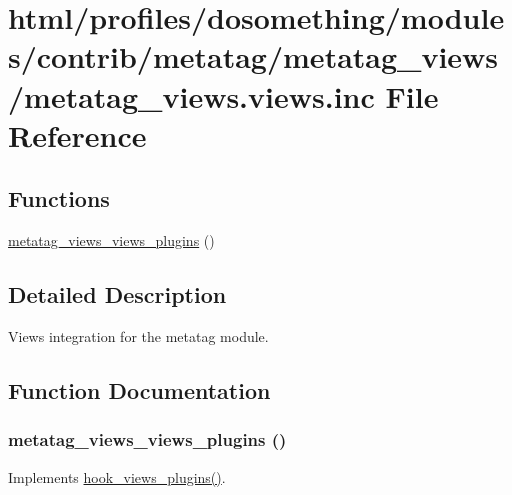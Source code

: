 \hypertarget{metatag__views_8views_8inc}{
\section{html/profiles/dosomething/modules/contrib/metatag/metatag\_\-views/metatag\_\-views.views.inc File Reference}
\label{metatag__views_8views_8inc}
}
\subsection*{Functions}
\begin{DoxyCompactItemize}
\item 
\hyperlink{metatag__views_8views_8inc_a70eae3bc7beb2d1b34318f96a46a3c00}{metatag\_\-views\_\-views\_\-plugins} ()
\end{DoxyCompactItemize}


\subsection{Detailed Description}
Views integration for the metatag module. 

\subsection{Function Documentation}
\hypertarget{metatag__views_8views_8inc_a70eae3bc7beb2d1b34318f96a46a3c00}{
\subsubsection[{metatag\_\-views\_\-views\_\-plugins}]{\setlength{\rightskip}{0pt plus 5cm}metatag\_\-views\_\-views\_\-plugins ()}}
\label{metatag__views_8views_8inc_a70eae3bc7beb2d1b34318f96a46a3c00}
Implements \hyperlink{group__views__hooks_ga23f6e9972b2ed84fc54b7ff63f44477d}{hook\_\-views\_\-plugins()}. 